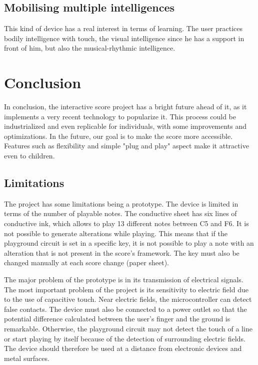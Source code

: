 \subsection{Mobilising multiple intelligences}

This kind of device has a real interest in terms of learning. The user practices bodily intelligence with touch, the visual intelligence since he has a support in front of him, but also the musical-rhythmic intelligence.

\section{Conclusion}

In conclusion, the interactive score project has a bright future ahead of it, as it implements a very recent technology to popularize it. This process could be industrialized and even replicable for individuals, with some improvements and optimizations. In the future, our goal is to make the score more accessible. Features such as flexibility and simple "plug and play" aspect make it attractive even to children.

\subsection{Limitations}

The project has some limitations being a prototype. The device is limited in terms of the number of playable notes. The conductive sheet has six lines of conductive ink, which allows to play 13 different notes between C5 and F6. It is not possible to generate alterations while playing. This means that if the playground circuit is set in a specific key, it is not possible to play a note with an alteration that is not present in the score's framework. The key must also be changed manually at each score change (paper sheet).

The major problem of the prototype is in its transmission of electrical signals. 
The most important problem of the project is its sensitivity to electric field due to the use of capacitive touch. Near electric fields, the microcontroller can detect false contacts. The device must also be connected to a power outlet so that the potential difference calculated between the user's finger and the ground is remarkable. Otherwise, the playground circuit may not detect the touch of a line or start playing by itself because of the detection of surrounding electric fields. The device should therefore be used at a distance from electronic devices and metal surfaces.

